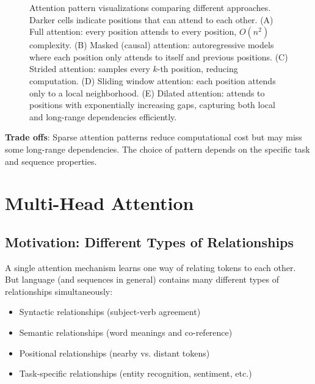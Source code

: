 \begin{figure}[h!]
  \caption{Attention pattern visualizations comparing different approaches. Darker cells indicate positions that can attend to each other. (A) Full attention: every position attends to every position, $O(n^2)$ complexity. (B) Masked (causal) attention: autoregressive models where each position only attends to itself and previous positions. (C) Strided attention: samples every $k$-th position, reducing computation. (D) Sliding window attention: each position attends only to a local neighborhood. (E) Dilated attention: attends to positions with exponentially increasing gaps, capturing both local and long-range dependencies efficiently.}
\end{figure}

\textbf{Trade offs}: Sparse attention patterns reduce computational cost but may miss some long-range dependencies. The choice of pattern depends on the specific task and sequence properties.

\section{Multi-Head Attention}

\subsection{Motivation: Different Types of Relationships}

A single attention mechanism learns one way of relating tokens to each other. But language (and sequences in general) contains many different types of relationships simultaneously:
\begin{itemize}
  \item Syntactic relationships (subject-verb agreement)
  \item Semantic relationships (word meanings and co-reference)
  \item Positional relationships (nearby vs. distant tokens)
  \item Task-specific relationships (entity recognition, sentiment, etc.)
\end{itemize}

